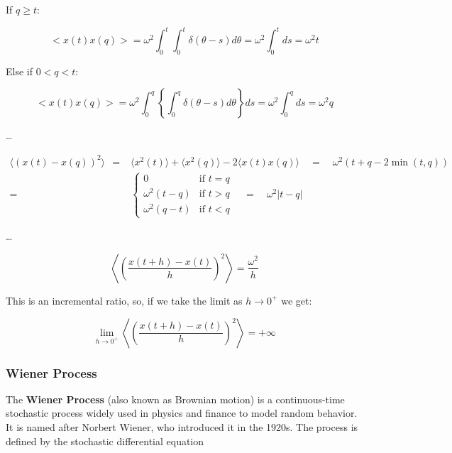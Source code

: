 \vspace{0.5em}

If $q \ge t$:

$$
<x(t)x(q)> = \omega^2 \int_0^t \int_0^t \delta(\theta - s) d\theta = \omega^2 \int_0^t ds = \omega^2 t
$$

Else if $0 < q < t$:

$$
<x(t)x(q)> = \omega^2 \int_0^q \left\{
    \int_0^q \delta(\theta - s) d\theta
\right\} ds
=
\omega^2 \int_0^q ds = \omega^2 q
$$

\vspace{4em}
\dots
\vspace{4em}

$$
\begin{array}{rl}
    \langle(x(t) - x(q))^2\rangle \ \ = & \langle x^2(t)\rangle + \langle x^2(q)\rangle - 2\langle x(t)x(q)\rangle 
    \quad = \quad 
    \omega^2 (t + q - 2 \min(t,q)) \\[0.5em]
    = &
    \begin{cases}
        0 & \text{if } t = q\\
        \omega^2 (t - q) & \text{if } t > q\\
        \omega^2 (q - t) & \text{if } t < q
    \end{cases} 
    \quad = \quad 
    \omega^2 |t - q|
\end{array}
$$

\vspace{4em}
\dots
\vspace{4em}

$$
\left \langle \left( 
\dfrac {x(t+h) - x(t)}{h} 
\right) ^2 \right \rangle
= \dfrac {\omega^2}{h}
$$

This is an incremental ratio, so, if we take the limit as $h \to 0^+$ we get:

$$
\lim_{h \to 0^+} \left \langle \left( 
\dfrac {x(t+h) - x(t)}{h} 
\right) ^2 \right \rangle
= + \infty
$$








\newpage

\subsubsection{Wiener Process}

The \textbf{Wiener Process} (also known as Brownian motion) is a continuous-time stochastic process widely used in physics and finance to model random behavior. It is named after Norbert Wiener, who introduced it in the 1920s. The process is defined by the stochastic differential equation

